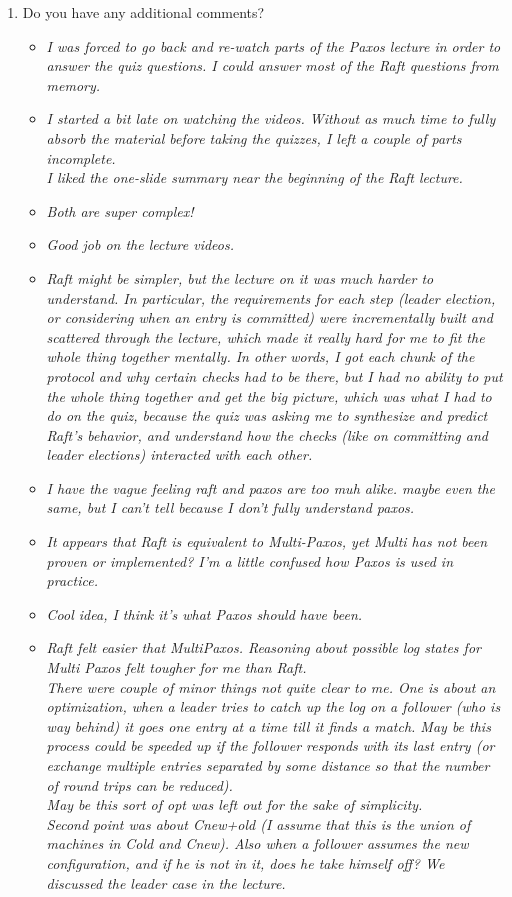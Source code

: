 \begin{enumerate}
\item Do you have any additional comments?

\begin{itemize}
\item \emph{I was forced to go back and re-watch parts of the Paxos lecture in order to answer the quiz questions. I could answer most of the Raft questions from memory.}
\item \emph{I started a bit late on watching the videos.  Without as much time to fully absorb the material before taking the quizzes, I left a couple of parts incomplete. \\ I liked the one-slide summary near the beginning of the Raft lecture.}
\item \emph{Both are super complex!}
\item \emph{Good job on the lecture videos.}
\item \emph{Raft might be simpler, but the lecture on it was much harder to understand. In particular, the requirements for each step (leader election, or considering when an entry is committed) were incrementally built and scattered through the lecture, which made it really hard for me to fit the whole thing together mentally. In other words, I got each chunk of the protocol and why certain checks had to be there, but I had no ability to put the whole thing together and get the big picture, which was what I had to do on the quiz, because the quiz was asking me to synthesize and predict Raft's behavior, and understand how the checks (like on committing and leader elections) interacted with each other.}
\item \emph{I have the vague feeling raft and paxos are too muh alike. maybe even the same, but I can't tell because I don't fully understand paxos.}
\item \emph{It appears that Raft is equivalent to Multi-Paxos, yet Multi has not been proven or implemented? I'm a little confused how Paxos is used in practice.}
\item \emph{Cool idea, I think it's what Paxos should have been.}
\item \emph{Raft felt easier that MultiPaxos. Reasoning about  possible log states for Multi Paxos felt tougher for me than Raft. \\ There were couple of minor things not quite clear to me. One is about an optimization, when a leader tries to catch up the log on a follower (who is way behind) it goes one entry at a time till it finds a match. May be this process could be speeded up if the follower responds with its last entry (or exchange multiple entries separated by some distance so that the number of round trips can be reduced).  \\ May be this sort of opt was left out for the sake of simplicity. \\ Second point was about Cnew+old (I assume that this is the union of machines in Cold and Cnew).  Also when a follower assumes the new configuration, and if he is not in it, does he take himself off? We discussed the leader case in the lecture.}

\end{itemize}
\end{enumerate}
